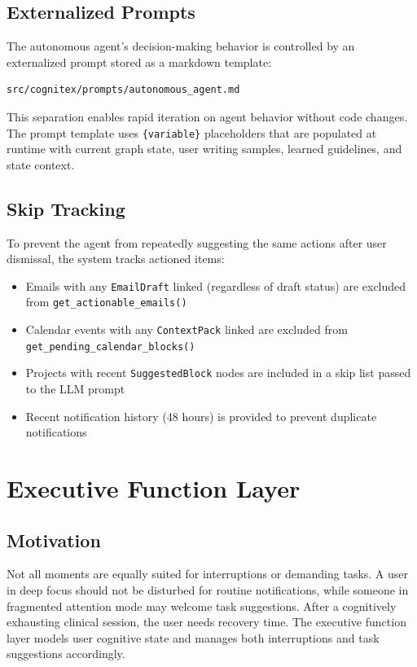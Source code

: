 \documentclass[11pt,a4paper]{article}
\begin{document}
\subsection{Externalized Prompts}

The autonomous agent's decision-making behavior is controlled by an externalized prompt stored as a markdown template:

\begin{lstlisting}[language=bash]
src/cognitex/prompts/autonomous_agent.md
\end{lstlisting}

This separation enables rapid iteration on agent behavior without code changes. The prompt template uses \texttt{\{variable\}} placeholders that are populated at runtime with current graph state, user writing samples, learned guidelines, and state context.

\subsection{Skip Tracking}

To prevent the agent from repeatedly suggesting the same actions after user dismissal, the system tracks actioned items:

\begin{itemize}
    \item Emails with any \texttt{EmailDraft} linked (regardless of draft status) are excluded from \texttt{get\_actionable\_emails()}
    \item Calendar events with any \texttt{ContextPack} linked are excluded from \texttt{get\_pending\_calendar\_blocks()}
    \item Projects with recent \texttt{SuggestedBlock} nodes are included in a skip list passed to the LLM prompt
    \item Recent notification history (48 hours) is provided to prevent duplicate notifications
\end{itemize}

\section{Executive Function Layer}
\label{sec:executive}

\subsection{Motivation}

Not all moments are equally suited for interruptions or demanding tasks. A user in deep focus should not be disturbed for routine notifications, while someone in fragmented attention mode may welcome task suggestions. After a cognitively exhausting clinical session, the user needs recovery time. The executive function layer models user cognitive state and manages both interruptions and task suggestions accordingly.
\end{document}
